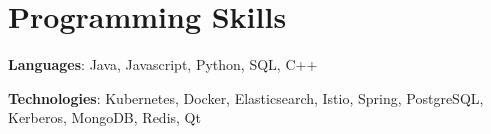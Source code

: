 

\section{Programming Skills}\label{sec:programming-skills}
\resumeSubHeadingListStart
\item{
    \textbf{Languages}{: Java, Javascript, Python, SQL, C++}
}
\item{
    \textbf{Technologies}{: Kubernetes, Docker, Elasticsearch, Istio, Spring, PostgreSQL, Kerberos, MongoDB, Redis, Qt}
}
\resumeSubHeadingListEnd

